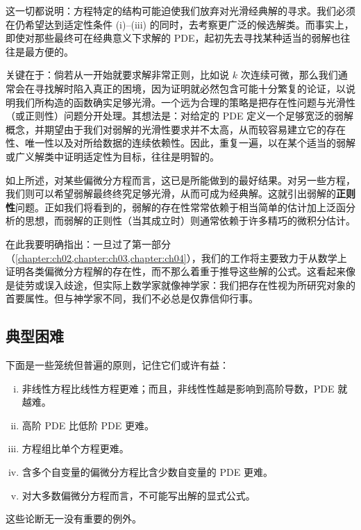 \documentclass[../../main.tex]{subfiles}
\begin{document}
这一切都说明：方程特定的结构可能迫使我们放弃对光滑经典解的寻求。我们必须在仍希望达到适定性条件 (i)--(iii) 的同时，去考察更广泛的候选解类。而事实上，即使对那些最终可在经典意义下求解的 PDE，起初先去寻找某种适当的弱解也往往是最方便的。

关键在于：倘若从一开始就要求解非常正则，比如说 $k$ 次连续可微，那么我们通常会在寻找解时陷入真正的困境，因为证明就必然包含可能十分繁复的论证，以说明我们所构造的函数确实足够光滑。一个远为合理的策略是把存在性问题与光滑性（或正则性）问题分开处理。其想法是：对给定的 PDE 定义一个足够宽泛的弱解概念，并期望由于我们对弱解的光滑性要求并不太高，从而较容易建立它的存在性、唯一性以及对所给数据的连续依赖性。因此，重复一遍，以在某个适当的弱解或广义解类中证明适定性为目标，往往是明智的。

如上所述，对某些偏微分方程而言，这已是所能做到的最好结果。对另一些方程，我们则可以希望弱解最终终究足够光滑，从而可成为经典解。这就引出弱解的\textbf{正则性}问题。正如我们将看到的，弱解的存在性常常依赖于相当简单的估计加上泛函分析的思想，而弱解的正则性（当其成立时）则通常依赖于许多精巧的微积分估计。

在此我要明确指出：一旦过了第一部分（\cref{chapter:ch02,chapter:ch03,chapter:ch04}），我们的工作将主要致力于从数学上证明各类偏微分方程解的存在性，而不那么着重于推导这些解的公式。这看起来像是徒劳或误入歧途，但实际上数学家就像神学家：我们把存在性视为所研究对象的首要属性。但与神学家不同，我们不必总是仅靠信仰行事。

\subsection{典型困难}\label{subsection:ch01-difficulties}

下面是一些笼统但普遍的原则，记住它们或许有益：
\begin{enumerate}[(i)]
\item 非线性方程比线性方程更难；而且，非线性性越是影响到高阶导数，PDE 就越难。
\item 高阶 PDE 比低阶 PDE 更难。
\item 方程组比单个方程更难。
\item 含多个自变量的偏微分方程比含少数自变量的 PDE 更难。
\item 对大多数偏微分方程而言，不可能写出解的显式公式。
\end{enumerate}
这些论断无一没有重要的例外。
\end{document}
